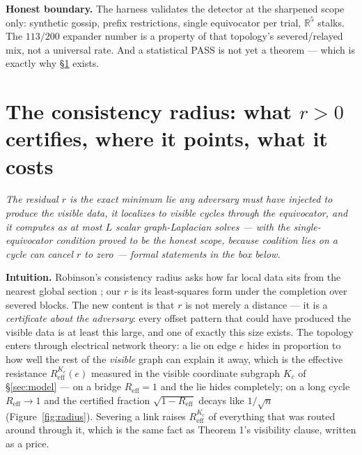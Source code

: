 \documentclass[11pt,a4paper]{article}
\newcommand{\onebreath}[1]{\begin{center}\emph{#1}\end{center}}
\begin{document}
\begin{boundary}
\textbf{Honest boundary.} The harness validates the detector at the sharpened scope only: synthetic gossip, prefix
restrictions, single equivocator per trial, $\mathbb{R}^5$ stalks. The $113/200$ expander number is a property of that
topology's severed/relayed mix, not a universal rate. And a statistical PASS is not yet a theorem --- which is exactly why
\S\ref{sec:radius} exists.
\end{boundary}

\section{The consistency radius: what $r>0$ certifies, where it points, what it costs}\label{sec:radius}

\onebreath{The residual $r$ is the exact minimum lie any adversary must have injected to produce the
visible data, it localizes to \emph{visible} cycles through the equivocator, and it computes as at most $L$ scalar graph-Laplacian
solves --- with the single-equivocator condition proved to be the honest scope, because coalition lies on a cycle can
cancel $r$ to zero --- formal statements in the box below.}

\textbf{Intuition.} Robinson's consistency radius asks how far local data sits from the nearest global section
\cite{robinson}; our $r$ is its least-squares form under the completion over severed blocks. The new content is that $r$ is
not merely a distance --- it is a \emph{certificate about the adversary}: every offset pattern that could have produced the
visible data is at least this large, and one of exactly this size exists. The topology enters through electrical network
theory: a lie on edge $e$ hides in proportion to how well the rest of the \emph{visible} graph can explain it away, which is
the effective resistance $R^{K_c}_{\mathrm{eff}}(e)$ measured in the visible coordinate subgraph $K_c$ of
\S\ref{sec:model} --- on a bridge $R_{\mathrm{eff}}=1$ and the lie hides completely; on a long cycle
$R_{\mathrm{eff}}\to1$ and the certified fraction $\sqrt{1-R_{\mathrm{eff}}}$ decays like $1/\sqrt{n}$
(Figure~\ref{fig:radius}). Severing a link raises $R^{K_c}_{\mathrm{eff}}$ of everything that was routed around through it,
which is the same fact as Theorem 1's visibility clause, written as a price.
\end{document}
